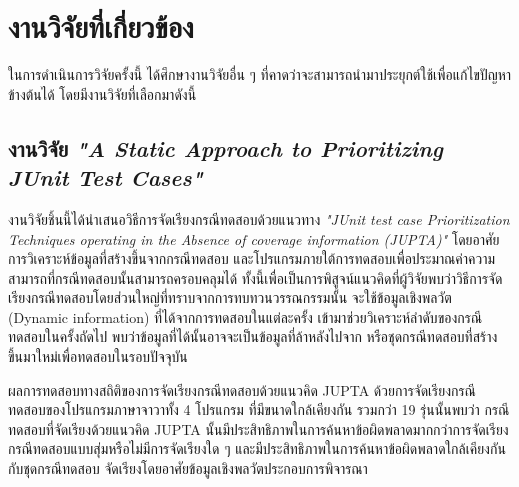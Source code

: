 \section{งานวิจัยที่เกี่ยวข้อง} 

ในการดำเนินการวิจัยครั้งนี้ ได้ศึกษางานวิจัยอื่น ๆ ที่คาดว่าจะสามารถนำมาประยุกต์ใช้เพื่อแก้ไขปัญหาข้างต้นได้ โดยมีงานวิจัยที่เลือกมาดังนี้

\subsection{งานวิจัย {\it "A Static Approach to Prioritizing JUnit Test Cases"} \cite{6363461}}

งานวิจัยชิ้นนี้ได้นำเสนอวิธีการจัดเรียงกรณีทดสอบด้วยแนวทาง \emph{"JUnit test case Prioritization Techniques operating in the Absence of coverage information (JUPTA)"} 
โดยอาศัยการวิเคราะห์ข้อมูล{\scg}ที่สร้างขึ้นจากกรณีทดสอบ และโปรแกรมภายใต้การทดสอบเพื่อประมาณค่าความสามารถที่กรณีทดสอบนั้นสามารถครอบคลุม{\sourcecode}ได้
ทั้งนี้เพื่อเป็นการพิสูจน์แนวคิดที่ผู้วิจัยพบว่าวิธีการจัดเรียงกรณีทดสอบโดยส่วนใหญ่ที่ทราบจากการทบทวนวรรณกรรมนั้น จะใช้ข้อมูลเชิงพลวัต (Dynamic information)
ที่ได้จากการทดสอบ{\sourcecode}ในแต่ละครั้ง เข้ามาช่วยวิเคราะห์ลำดับของกรณีทดสอบในครั้งถัดไป พบว่าข้อมูลที่ได้นั้นอาจจะเป็นข้อมูลที่ล้าหลังไปจาก{\sourcecode} 
หรือชุดกรณีทดสอบที่สร้างขึ้นมาใหม่เพื่อทดสอบในรอบปัจจุบัน 

ผลการทดสอบทางสถิติของการจัดเรียงกรณีทดสอบด้วยแนวคิด JUPTA ด้วยการจัดเรียงกรณีทดสอบของโปรแกรมภาษาจาวาทั้ง 4 โปรแกรม ที่มีขนาดใกล้เคียงกัน
รวมกว่า 19 รุ่นนั้นพบว่า กรณีทดสอบที่จัดเรียงด้วยแนวคิด JUPTA นั้นมีประสิทธิภาพในการค้นหาข้อผิดพลาดมากกว่าการจัดเรียงกรณีทดสอบแบบสุ่มหรือไม่มีการจัดเรียงใด ๆ 
และมีประสิทธิภาพในการค้นหาข้อผิดพลาดใกล้เคียงกันกับชุดกรณีทดสอบ จัดเรียงโดยอาศัยข้อมูลเชิงพลวัตประกอบการพิจารณา

